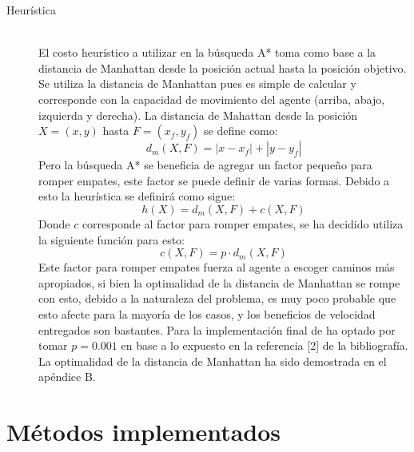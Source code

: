 \documentclass[letter, titlepage, 10pt]{article}
\newcommand{\abs}[1]{\left\vert#1\right\vert}
\begin{document}
\begin{description}
    \item[Heurística] \hfill \\
  El costo heurístico a utilizar en la búsqueda A* toma como base a la distancia de Manhattan desde la posición actual hasta la posición objetivo. Se utiliza la distancia de Manhattan pues es simple de calcular y corresponde con la capacidad de movimiento del agente (arriba, abajo, izquierda y derecha). La distancia de Mahattan desde la posición $X = (x,y)$ hasta $F = (x_f,y_f)$ se define como:
    \begin{displaymath}
      d_m(X,F) = \abs{x-x_f} + \abs{y-y_f} 
    \end{displaymath}
    Pero la búsqueda A* se beneficia de agregar un factor pequeño para romper empates, este factor se puede definir de varias formas.
  Debido a esto la heurística se definirá como sigue:   
  \begin{displaymath}
      h(X) = d_m(X,F) + c(X,F) 
    \end{displaymath}   
    Donde $c$ corresponde al factor para romper empates, se ha decidido utiliza la siguiente función para esto:
      \begin{displaymath}
          c(X,F) = p \cdot d_m(X,F)
        \end{displaymath}   
    Este factor para romper empates fuerza al agente a escoger caminos más apropiados, si bien la optimalidad de la distancia de Manhattan se rompe con esto, debido a la naturaleza del problema, es muy poco probable que esto afecte para la mayoría de los casos, y los beneficios de velocidad entregados son bastantes. Para la implementación final de ha optado por tomar $p = 0.001$ en base a lo expuesto en la referencia [2] de la bibliografía. La optimalidad de la distancia de Manhattan ha sido demostrada en el apéndice B.

\end{description}


\newpage

\section{Métodos implementados}
\end{document}
